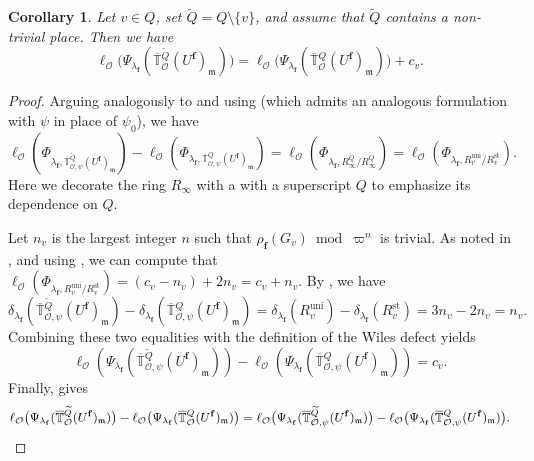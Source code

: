 \documentclass[a4paper, notitlepage, 10pt]{amsart}
\theoremstyle{plain} %
\newtheorem{corollary}[theorem]{Corollary}
\theoremstyle{definition} %
\theoremstyle{remark} %
\numberwithin{equation}{section}
\newcommand{\bbT}{\mathbb T}
\newcommand{\uni}{\operatorname{uni}}
\newcommand{\st}{\operatorname{st}}
\begin{document}
\begin{corollary}\label{changeofcongmoduleforheckealg}
    Let $v\in Q$, set $\widetilde{Q}=Q\setminus\{v\}$, and assume that $\widetilde{Q}$ contains a non-trivial place. Then we have
    $$ \ell_{\mathcal{O}}\big(\Psi_{\lambda_{\mathbf{f}}}(\overline{\mathbb{T}}{}^{\widetilde{Q}}_{\mathcal{O}}(U^{\mathbf{f}})_{\mathfrak{m}})\big)=\ell_{\mathcal{O}}\big(\Psi_{\lambda_{\mathbf{f}}}(\overline{\mathbb{T}}{}^{Q}_{\mathcal{O}}(U^{\mathbf{f}})_{\mathfrak{m}})\big)+c_v. $$
\end{corollary}
\begin{proof}
    Arguing analogously to \cite[Proposition 7.14]{BKM1} and using   (which admits an analogous formulation with $\psi$ in place of $\psi_0$), we have  
     $$\ell_{\mathcal{O}}(\Phi_{\lambda_{\mathbf{f}},\overline{\mathbb{T}}{}^{\widetilde{Q}}_{\mathcal{O},\psi}(U^{\mathbf{f}})_{\mathfrak{m}}})- \ell_{\mathcal{O}}(\Phi_{\lambda_{\mathbf{f}},\overline{\mathbb{T}}{}^{Q}_{\mathcal{O},\psi}(U^{\mathbf{f}})_{\mathfrak{m}}})= \ell_{\mathcal{O}}(\Phi_{\lambda_{\mathbf{f}}, R^{\widetilde{Q}}_\infty/R^{Q}_\infty})= \ell_{\mathcal{O}}(\Phi_{\lambda_{\mathbf{f}}, R^{\uni}_v/R^{\st}_v}). $$
     Here we decorate the ring $R_\infty$ with a with a superscript $Q$ to emphasize its dependence on $Q$.
     
    Let $n_v$ is the largest integer $n$ such that $\rho_{\mathbf{f}}(G_v) \bmod \varpi^n$ is trivial. As noted in \cite[Remark 7.8]{BKM2}, and using \cite[Proposition 7.9 (3.)]{BKM1}, we can compute that $\ell_{\mathcal{O}}(\Phi_{\lambda_{\mathbf{f}}, R^{\uni}_v/R^{\st}_v})=(c_v-n_v)+2n_v=c_v+n_v$. By \cite[Theorem 6.5]{BKM2}, we have
    $$ \delta_{\lambda_{\mathbf{f}}}(\overline{\mathbb{T}}{}^{\widetilde{Q}}_{\mathcal{O},\psi}(U^{\mathbf{f}})_{\mathfrak{m}}) -\delta_{\lambda_{\mathbf{f}}}(\overline{\mathbb{T}}{}^{Q}_{\mathcal{O},\psi}(U^{\mathbf{f}})_{\mathfrak{m}})=\delta_{\lambda_{\mathbf{f}}}(R^{\uni}_v)-\delta_{\lambda_{\mathbf{f}}}(R^{\st}_v)=3n_v-2n_v=n_v.$$
   Combining these two equalities with the definition of the Wiles defect yields
    $$\ell_{\mathcal{O}}(\Psi_{\lambda_{\mathbf{f}}}(\overline{\bbT}{}^{\widetilde{Q}}_{\mathcal{O},\psi}(U^{\mathbf{f}})_{\mathfrak{m}}))- \ell_{\mathcal{O}}(\Psi_{\lambda_{\mathbf{f}}}(\overline{\bbT}{}^{Q}_{\mathcal{O},\psi}(U^{\mathbf{f}})_{\mathfrak{m}}))=c_v.$$
    Finally,  gives
    $$ \ell_{\mathcal{O}}\big(\Psi_{\lambda_{\mathbf{f}}}(\overline{\bbT}{}^{\widetilde{Q}}_{\mathcal{O}}(U^{\mathbf{f}})_{\mathfrak{m}})\big)- \ell_{\mathcal{O}}\big(\Psi_{\lambda_{\mathbf{f}}}(\overline{\bbT}{}^{Q}_{\mathcal{O}}(U^{\mathbf{f}})_{\mathfrak{m}})\big)= \ell_{\mathcal{O}}\big(\Psi_{\lambda_{\mathbf{f}}}(\overline{\bbT}{}^{\widetilde{Q}}_{\mathcal{O},\psi}(U^{\mathbf{f}})_{\mathfrak{m}})\big)- \ell_{\mathcal{O}}\big(\Psi_{\lambda_{\mathbf{f}}}(\overline{\bbT}{}^{Q}_{\mathcal{O},\psi}(U^{\mathbf{f}})_{\mathfrak{m}})\big). \qedhere  $$ 
\end{proof}
\end{document}
